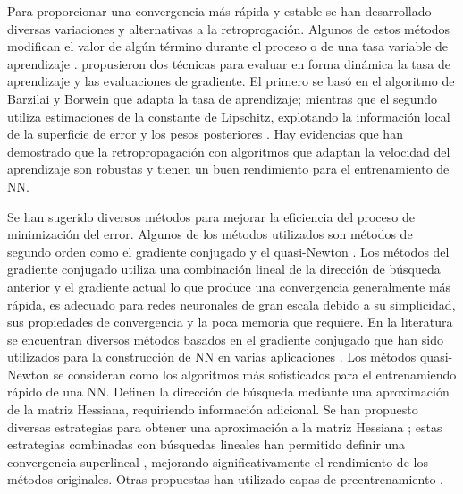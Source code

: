 Para proporcionar una convergencia más rápida y estable se han desarrollado diversas variaciones y alternativas a la retroprogación. Algunos de estos métodos modifican el valor de algún término durante el proceso \cite{Jacobs1988, Rumelhart1986b} o de una tasa variable de aprendizaje \cite{Jacobs1988, Vogl1988}.  propusieron dos técnicas para evaluar en forma dinámica la tasa de aprendizaje y las evaluaciones de gradiente. El primero se basó en el algoritmo de Barzilai y Borwein \cite{Barzilai1988} que adapta la tasa de aprendizaje; mientras que el segundo utiliza estimaciones de la constante de Lipschitz, explotando la información local de la superficie de error y los pesos posteriores \cite{Magoulas1997}. Hay evidencias \cite{Magoulas1997, Plagianakos2002, Plagianakos1998} que han demostrado que la retropropagación con algoritmos que adaptan la velocidad del aprendizaje son robustas y tienen un buen rendimiento para el entrenamiento de NN.

Se han sugerido diversos métodos para mejorar la eficiencia del proceso de minimización del error. Algunos de los métodos utilizados son métodos de segundo orden como el gradiente conjugado \cite{Fletcher1964, Hestenes1952, Polak1969} y el quasi-Newton \cite{Huang1970, Nocedal2006}. Los métodos del gradiente conjugado utiliza una combinación lineal de la dirección de búsqueda anterior y el gradiente actual lo que produce una convergencia generalmente más rápida, es adecuado para redes neuronales de gran escala debido a su simplicidad, sus propiedades de convergencia y la poca memoria que requiere. En la literatura  se encuentran diversos métodos basados en el gradiente conjugado \cite{Birgin2001, Moller1993} que han sido utilizados para la construcción de NN en varias aplicaciones \cite{Charalambous1992, Peng2007, Sotiropoulos2002}. Los métodos quasi-Newton se consideran como los algoritmos más sofisticados para el entrenamiendo rápido de una NN. Definen la dirección de búsqueda mediante una aproximación de la matriz Hessiana, requiriendo información adicional. Se han propuesto diversas estrategias para  obtener una aproximación a la matriz Hessiana \cite{Al-Baali1998, Nocedal1993, Oren1972, Oren1974, Yin2007}; estas estrategias combinadas con búsquedas lineales han permitido definir una convergencia superlineal \cite{Yin2007}, mejorando significativamente el rendimiento de los métodos originales. Otras propuestas han utilizado capas de preentrenamiento \cite{Hinton2006b}.

